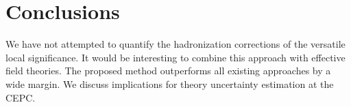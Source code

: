 \section{Conclusions}\label{sec:conclusions}

We have not attempted to quantify the hadronization corrections of the
versatile local significance. It would be interesting to combine this
approach with effective field theories. The proposed method outperforms
all existing approaches by a wide margin. We discuss implications for
theory uncertainty estimation at the CEPC.

